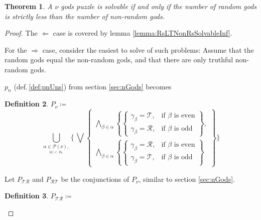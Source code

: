 \documentclass[twoside,twocolumn,a4paper,11pt]{article}
\newtheorem{theorem}{Theorem}[section]
\theoremstyle{definition}
\newtheorem{defn}[theorem]{Definition}
\begin{document}
\begin{theorem}
\label{theorem:nuGodsSolvability}
A $\nu$ gods puzzle is solvable if and only if the number of random gods is strictly less than
the number of non-random gods.
\end{theorem}
\begin{proof}%
The $\Leftarrow$ case is covered by lemma \ref{lemma:RsLTNonRsSolvableInf}.




For the $\Rightarrow$ case,
consider the easiest to solve of such problems:
Assume 
that the random gods equal the non-random gods,
and that there are only truthful non-random gods.

$p_n$ (def.\,\ref{def:pnUns}) from section \ref{sec:nGods} becomes
\begin{defn}
\label{def:PnuUns}
$P_\nu \coloneqq $
 \begin{equation}
 \label{eq:nonSolvable2}
  \bigcup_{\underset{|\alpha|<\aleph_0}{\alpha\in\mathscr{P}(\nu),}}
   \{\,
   \bigvee
    \left\lbrace
     \begin{matrix}
      \bigwedge\limits_{\beta\in\alpha}
      \left\lbrace
       \begin{cases}
        \gamma_\beta\!=\!\mathcal{T},&\text{if } \beta \text{ is even}\\
        \gamma_\beta\!=\!\mathcal{R},&\text{if } \beta \text{ is odd}
       \end{cases}
      \right\rbrace\!\!,\\
      \bigwedge\limits_{\beta\in\alpha}
      \left\lbrace
       \begin{cases}
        \gamma_\beta\!=\!\mathcal{R},&\text{if } \beta \text{ is even}\\
        \gamma_\beta\!=\!\mathcal{T},&\text{if } \beta \text{ is odd}
       \end{cases}
      \right\rbrace%
     \end{matrix}
    \right\rbrace
   \}
 \end{equation}
\end{defn}
Let 
$P_{\mathcal{\scriptscriptstyle T}\mathcal{\scriptscriptstyle R}}$ and
$P_{\mathcal{\scriptscriptstyle R}\mathcal{\scriptscriptstyle T}}$ be the
conjunctions of $P_\nu$, similar to section \ref{sec:nGods}.
\begin{defn}
\label{def:PTR}
$P_{\mathcal{\scriptscriptstyle T}\mathcal{\scriptscriptstyle R}} \coloneqq $
 \begin{equation}

\end{equation}
\end{defn}
\end{proof}
\end{document}
